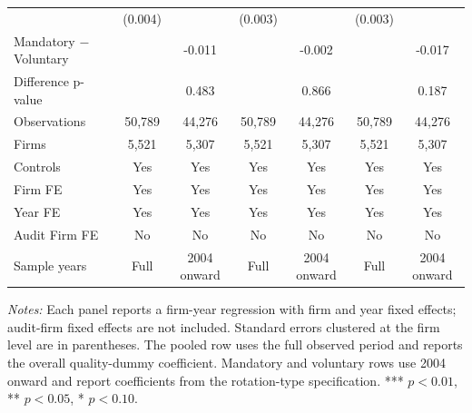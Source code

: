 \begin{table}[htbp]
\begin{threeparttable}
{\begin{tabular}{l cc cc cc}
 & (0.004) &  & (0.003) &  & (0.003) &  \\
Mandatory $-$ Voluntary &  & -0.011 &  & -0.002 &  & -0.017 \\
Difference p-value &  & 0.483 &  & 0.866 &  & 0.187 \\
Observations & 50,789 & 44,276 & 50,789 & 44,276 & 50,789 & 44,276 \\
Firms & 5,521 & 5,307 & 5,521 & 5,307 & 5,521 & 5,307 \\
\midrule
Controls & Yes & Yes & Yes & Yes & Yes & Yes \\
Firm FE & Yes & Yes & Yes & Yes & Yes & Yes \\
Year FE & Yes & Yes & Yes & Yes & Yes & Yes \\
Audit Firm FE & No & No & No & No & No & No \\
Sample years & Full & 2004 onward & Full & 2004 onward & Full & 2004 onward \\
\bottomrule
\end{tabular}}
\begin{tablenotes}\footnotesize
\item \textit{Notes:} Each panel reports a firm-year regression with firm and year fixed effects; audit-firm fixed effects are not included. Standard errors clustered at the firm level are in parentheses. The pooled row uses the full observed period and reports the overall quality-dummy coefficient. Mandatory and voluntary rows use 2004 onward and report coefficients from the rotation-type specification. *** \(p<0.01\), ** \(p<0.05\), * \(p<0.10\).
\end{tablenotes}
\end{threeparttable}
\end{table}
